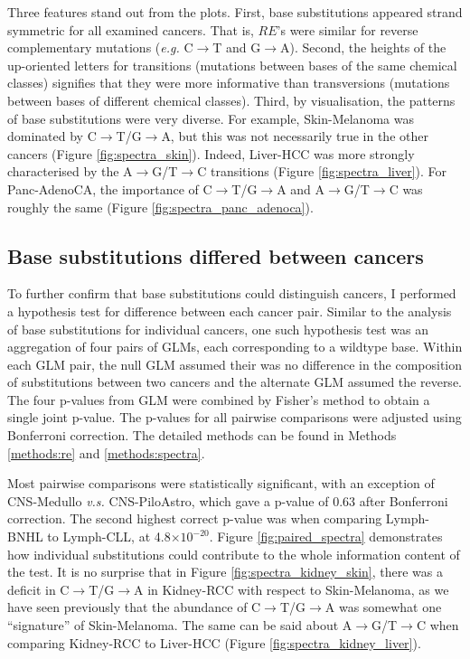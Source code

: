 Three features stand out from the plots. First, base substitutions appeared strand symmetric for all examined cancers. That is, $RE$'s were similar for reverse complementary mutations (\textit{e.g.} C$\rightarrow$T and G$\rightarrow$A). Second, the heights of the up-oriented letters for \glspl{transition} (mutations between bases of the same chemical classes) signifies that they were more informative than \glspl{transversion} (mutations between bases of different chemical classes). Third, by visualisation, the patterns of base substitutions were very diverse. For example, Skin-Melanoma was dominated by C$\rightarrow$T/G$\rightarrow$A, but this was not necessarily true in the other cancers (Figure \ref{fig:spectra_skin}). Indeed, Liver-HCC was more strongly characterised by the A$\rightarrow$G/T$\rightarrow$C transitions (Figure \ref{fig:spectra_liver}). For Panc-AdenoCA, the importance of C$\rightarrow$T/G$\rightarrow$A and A$\rightarrow$G/T$\rightarrow$C was roughly the same (Figure \ref{fig:spectra_panc_adenoca}).



\subsection{Base substitutions differed between cancers}
To further confirm that base substitutions could distinguish cancers, I performed a hypothesis test for difference between each cancer pair. Similar to the analysis of base substitutions for individual cancers, one such hypothesis test was an aggregation of four pairs of GLMs, each corresponding to a wildtype base. Within each GLM pair, the null GLM assumed their was no difference in the composition of substitutions between two cancers and the alternate GLM assumed the reverse. The four p-values from GLM were combined by Fisher's method to obtain a single joint p-value. The p-values for all pairwise comparisons were adjusted using Bonferroni correction. The detailed methods can be found in Methods \ref{methods:re} and \ref{methods:spectra}.

Most pairwise comparisons were statistically significant, with an exception of CNS-Medullo \textit{v.s.} CNS-PiloAstro, which gave a p-value of 0.63 after Bonferroni correction. The second highest correct p-value was when comparing Lymph-BNHL to Lymph-CLL, at 4.8$\times10^{-20}$. Figure \ref{fig:paired_spectra} demonstrates how individual substitutions could contribute to the whole information content of the test. It is no surprise that in Figure \ref{fig:spectra_kidney_skin}, there was a deficit in C$\rightarrow$T/G$\rightarrow$A in Kidney-RCC with respect to Skin-Melanoma, as we have seen previously that the abundance of C$\rightarrow$T/G$\rightarrow$A was somewhat one ``signature'' of Skin-Melanoma. The same can be said about A$\rightarrow$G/T$\rightarrow$C when comparing Kidney-RCC to Liver-HCC (Figure \ref{fig:spectra_kidney_liver}).


